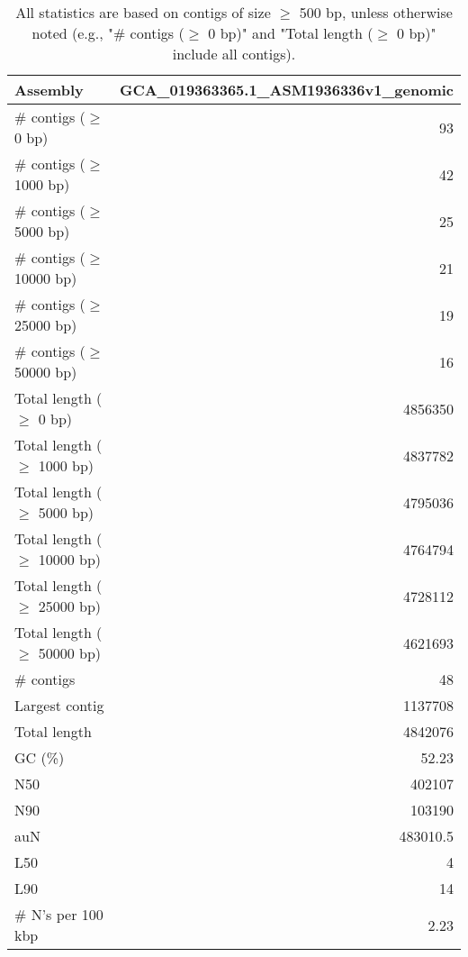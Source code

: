 \documentclass[12pt,a4paper]{article}
\begin{document}
\begin{table}[ht]
\begin{center}
\caption{All statistics are based on contigs of size $\geq$ 500 bp, unless otherwise noted (e.g., "\# contigs ($\geq$ 0 bp)" and "Total length ($\geq$ 0 bp)" include all contigs).}
\begin{tabular}{|l*{1}{|r}|}
\hline
Assembly & GCA\_019363365.1\_ASM1936336v1\_genomic \\ \hline
\# contigs ($\geq$ 0 bp) & 93 \\ \hline
\# contigs ($\geq$ 1000 bp) & 42 \\ \hline
\# contigs ($\geq$ 5000 bp) & 25 \\ \hline
\# contigs ($\geq$ 10000 bp) & 21 \\ \hline
\# contigs ($\geq$ 25000 bp) & 19 \\ \hline
\# contigs ($\geq$ 50000 bp) & 16 \\ \hline
Total length ($\geq$ 0 bp) & 4856350 \\ \hline
Total length ($\geq$ 1000 bp) & 4837782 \\ \hline
Total length ($\geq$ 5000 bp) & 4795036 \\ \hline
Total length ($\geq$ 10000 bp) & 4764794 \\ \hline
Total length ($\geq$ 25000 bp) & 4728112 \\ \hline
Total length ($\geq$ 50000 bp) & 4621693 \\ \hline
\# contigs & 48 \\ \hline
Largest contig & 1137708 \\ \hline
Total length & 4842076 \\ \hline
GC (\%) & 52.23 \\ \hline
N50 & 402107 \\ \hline
N90 & 103190 \\ \hline
auN & 483010.5 \\ \hline
L50 & 4 \\ \hline
L90 & 14 \\ \hline
\# N's per 100 kbp & 2.23 \\ \hline
\end{tabular}
\end{center}
\end{table}
\end{document}
